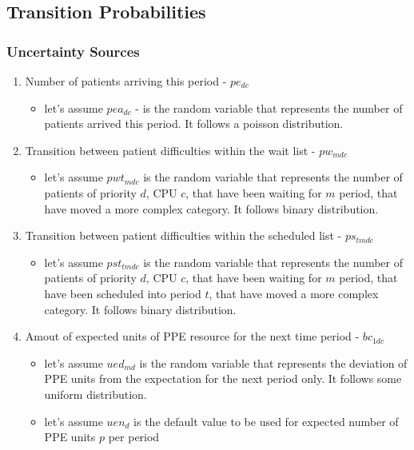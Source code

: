 \documentclass{article}
\begin{document}
\subsection{Transition Probabilities}

\subsubsection{Uncertainty Sources}
\begin{enumerate}
    	
	\item Number of patients arriving this period - $pe_{dc}$
		\begin{itemize}
			\item let's assume $pea_{dc}$ - is the random variable that represents the number of patients arrived this period. It follows a poisson distribution.
		\end{itemize}
	
	\item Transition between patient difficulties within the wait list - $pw_{mdc}$
		\begin{itemize}
			\item let's assume $pwt_{mdc}$ is the random variable that represents the number of patients of priority $d$, CPU $c$, that have been waiting for $m$ period, that have moved a more complex category. It follows binary distribution.
		\end{itemize}
		
	\item Transition between patient difficulties within the scheduled list - $ps_{tmdc}$
		\begin{itemize}
			\item let's assume $pst_{tmdc}$ is the random variable that represents the number of patients of priority $d$, CPU $c$, that have been waiting for $m$ period, that have been scheduled into period $t$, that have moved a more complex category. It follows binary distribution.
		\end{itemize}

	\item Amout of expected units of PPE resource for the next time period - $bc_{1dc}$
		\begin{itemize}
			\item let's assume $ued_{md}$ is the random variable that represents the deviation of PPE units from the expectation for the next period only. It follows some uniform distribution.
			\item let's assume $uen_{d}$ is the default value to be used for expected number of PPE units $p$ per period
		\end{itemize}
\end{enumerate}
\end{document}
